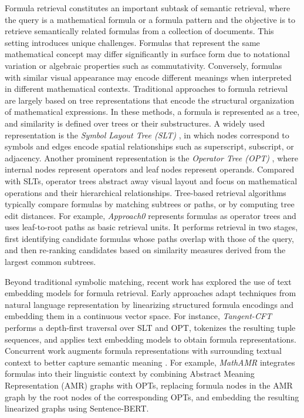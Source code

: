 \documentclass[11pt]{article}
\numberwithin{equation}{section}
\begin{document}
Formula retrieval constitutes an important subtask of semantic retrieval, where the query is a mathematical formula or a formula pattern and the objective is to retrieve semantically related formulas from a collection of documents. This setting introduces unique challenges. Formulas that represent the same mathematical concept may differ significantly in surface form due to notational variation or algebraic properties such as commutativity. Conversely, formulas with similar visual appearance may encode different meanings when interpreted in different mathematical contexts. Traditional approaches to formula retrieval are largely based on tree representations that encode the structural organization of mathematical expressions. In these methods, a formula is represented as a tree, and similarity is defined over trees or their substructures. A widely used representation is the \textit{Symbol Layout Tree (SLT)} \cite{DBLP:journals/ijdar/ZanibbiB12}, in which nodes correspond to symbols and edges encode spatial relationships such as superscript, subscript, or adjacency. Another prominent representation is the \textit{Operator Tree (OPT)} \cite{DBLP:conf/ntcir/GaoYWJT16}, where internal nodes represent operators and leaf nodes represent operands. Compared with SLTs, operator trees abstract away visual layout and focus on mathematical operations and their hierarchical relationships. Tree-based retrieval algorithms typically compare formulas by matching subtrees or paths, or by computing tree edit distances. For example, \textit{Approach0} \cite{DBLP:conf/ecir/ZhongZ19,10.1007/978-3-030-45439-5_47} represents formulas as operator trees and uses leaf-to-root paths as basic retrieval units. It performs retrieval in two stages, first identifying candidate formulas whose paths overlap with those of the query, and then re-ranking candidates based on similarity measures derived from the largest common subtrees. 

Beyond traditional symbolic matching, recent work has explored the use of text embedding models for formula retrieval. Early approaches adapt techniques from natural language representation by linearizing structured formula encodings and embedding them in a continuous vector space. For instance, \textit{Tangent-CFT} \cite{10.1145/3341981.3344235} performs a depth-first traversal over SLT and OPT, tokenizes the resulting tuple sequences, and applies text embedding models to obtain formula representations. Concurrent work augments formula representations with surrounding textual context to better capture semantic meaning \cite{10.1145/3511808.3557567,krstovski2018equation}. For example, \textit{MathAMR} \cite{10.1145/3511808.3557567} integrates formulas into their linguistic context by combining Abstract Meaning Representation (AMR) graphs with OPTs, replacing formula nodes in the AMR graph by the root nodes of the corresponding OPTs, and embedding the resulting linearized graphs using Sentence-BERT.
\end{document}
